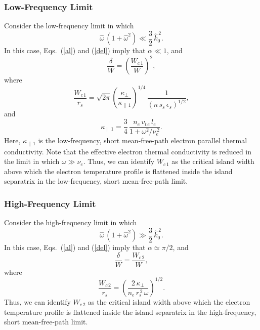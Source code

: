 \documentclass[12pt,prb,aps]{revtex4-1}
\begin{document}
\subsubsection{Low-Frequency Limit}
Consider the low-frequency limit in which
\begin{equation}
\hat{\omega}\,(1+\hat{\omega}^2)\ll \frac{3}{2}\,\hat{k}_0^{\,2}.
\end{equation}
 In this case, Eqs.~(\ref{al}) and (\ref{del}) imply that $\alpha\ll 1$, and 
 \begin{equation}
 \frac{\delta}{W} = \left(\frac{W_{c\,1}}{W}\right)^2,
\end{equation}
where\,\cite{rf}
\begin{equation}
\frac{W_{c\,1}}{r_s} =
\sqrt{2\pi}\left(\frac{\kappa_\perp}{\kappa_{\parallel\,1}}\right)^{1/4}\,\frac{1}{(n\,s_s\,\epsilon_s)^{1/2}},
\end{equation}
and 
\begin{equation}
\kappa_{\parallel\,1} = \frac{3}{4}\,\frac{n_e\,v_{t\,e}\,l_e}{1+\omega^2/\nu_e^{\,2}}.
\end{equation}
Here, $\kappa_{\parallel\,1}$ is the low-frequency, short mean-free-path electron parallel thermal conductivity. Note that the effective
electron thermal conductivity is reduced in the limit in which $\omega\gg \nu_e$.  Thus, we
can identify $W_{c\,1}$ as the critical island width above which the electron temperature profile is flattened inside the island separatrix
in the low-frequency, short mean-free-path limit.

\subsubsection{High-Frequency Limit}
Consider the high-frequency limit in which
\begin{equation}
\hat{\omega}\,(1+\hat{\omega}^2)\gg \frac{3}{2}\,\hat{k}_0^{\,2}.
\end{equation}
 In this case, Eqs.~(\ref{al}) and (\ref{del}) imply that $\alpha\simeq \pi/2$, and 
 \begin{equation}
 \frac{\delta}{W} = \frac{W_{c\,2}}{W},
 \end{equation}
 where
 \begin{equation}
 \frac{W_{c\,2}}{r_s} = \left(\frac{2\,\kappa_\perp}{n_e\,r_s^{\,2}\,\omega}\right)^{1/2}.
 \end{equation}
Thus, we
can identify $W_{c\,2}$ as the critical island width above which the electron temperature profile is flattened inside the island separatrix
in the  high-frequency, short mean-free-path limit.
\end{document}
